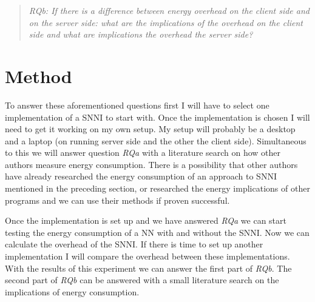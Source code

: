 \documentclass[../thesis.tex]{subfiles}
\begin{document}
\begin{quote} \emph{RQb: If there is a difference between energy overhead on the client side and on the server side: what are the implications of the overhead on the client side and what are implications the overhead the server side?} \end{quote}

\section{Method}
To answer these aforementioned questions first I will have to select one implementation of a SNNI to start with. Once the implementation is chosen I will need to get it working on my own setup. My setup will probably be a desktop and a laptop (on running server side and the other the client side). Simultaneous to this we will answer question \textit{RQa} with a literature search on how other authors measure energy consumption. There is a possibility that other authors have already researched the energy consumption of an approach to SNNI mentioned in the preceding section, or researched the energy implications of other programs and we can use their methods if proven successful.

Once the implementation is set up and we have answered \textit{RQa} we can start testing the energy consumption of a NN with and without the SNNI. Now we can calculate the overhead of the SNNI. If there is time to set up another implementation I will compare the overhead between these implementations. With the results of this experiment we can answer the first part of \textit{RQb}. The second part of \textit{RQb} can be answered with a small literature search on the implications of energy consumption. 
\end{document}

